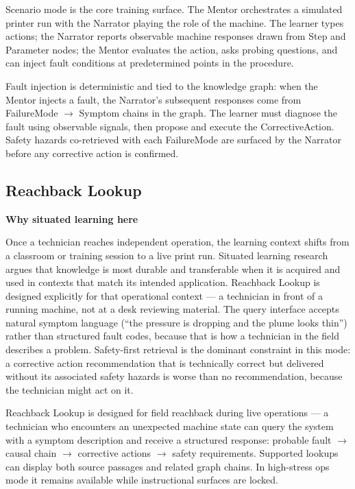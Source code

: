 \documentclass[10pt,letterpaper,twocolumn]{article}
\newenvironment{rationale}[1]{%
  \par\medskip\noindent
  \begin{lrbox}{\rationalebox}%
  \begin{minipage}{\dimexpr\linewidth-2\fboxsep-2\fboxrule\relax}
  \textbf{\sffamily\color{tmink}#1}\par\smallskip
}{%
  \end{minipage}%
  \end{lrbox}%
  \fcolorbox{tmaccent!55}{tmaccent!6}{\usebox{\rationalebox}}%
  \par\medskip
}
\newcommand{\arrowto}{$\rightarrow$}
\begin{document}
Scenario mode is the core training surface. The Mentor orchestrates a simulated printer run with the Narrator playing the role of the machine. The learner types actions; the Narrator reports observable machine responses drawn from Step and Parameter nodes; the Mentor evaluates the action, asks probing questions, and can inject fault conditions at predetermined points in the procedure.

Fault injection is deterministic and tied to the knowledge graph: when the Mentor injects a fault, the Narrator's subsequent responses come from FailureMode \arrowto{} Symptom chains in the graph. The learner must diagnose the fault using observable signals, then propose and execute the CorrectiveAction. Safety hazards co-retrieved with each FailureMode are surfaced by the Narrator before any corrective action is confirmed.

\subsection{Reachback Lookup}
\label{sec:reachback-lookup}

\begin{rationale}{Why situated learning here}
Once a technician reaches independent operation, the learning context shifts from a classroom or training session to a live print run. Situated learning research argues that knowledge is most durable and transferable when it is acquired and used in contexts that match its intended application. Reachback Lookup is designed explicitly for that operational context --- a technician in front of a running machine, not at a desk reviewing material. The query interface accepts natural symptom language (``the pressure is dropping and the plume looks thin'') rather than structured fault codes, because that is how a technician in the field describes a problem. Safety-first retrieval is the dominant constraint in this mode: a corrective action recommendation that is technically correct but delivered without its associated safety hazards is worse than no recommendation, because the technician might act on it.
\end{rationale}

Reachback Lookup is designed for field reachback during live operations --- a technician who encounters an unexpected machine state can query the system with a symptom description and receive a structured response: probable fault \arrowto{} causal chain \arrowto{} corrective actions \arrowto{} safety requirements. Supported lookups can display both source passages and related graph chains. In high-stress ops mode it remains available while instructional surfaces are locked.
\end{document}
